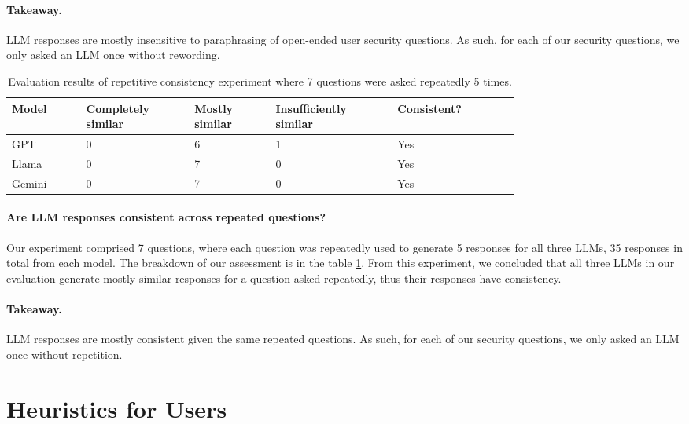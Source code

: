 \paragraph{Takeaway.} LLM responses are mostly insensitive to paraphrasing of open-ended user security questions. As such, for each of our security questions, we only asked an LLM once without rewording.

\begin{table}[!h]

\if {}
\fi
    \centering
    \setlength{\abovecaptionskip}{0pt}
    \caption{Evaluation results of repetitive consistency experiment where 7 questions were asked repeatedly 5 times.}
    \label{tab:repetitive-consistency-eval}
    \begin{tabular}{p{0.11\linewidth} p{0.16\linewidth} p{0.12\linewidth} p{0.18\linewidth} p{0.18\linewidth}}
        \toprule
        Model & Completely similar & Mostly similar & Insufficiently similar & Consistent? \\
        \midrule
        GPT & 0 & 6 & 1 & Yes\\
        Llama & 0 & 7 & 0 & Yes\\
        Gemini & 0 & 7 & 0  & Yes\\
        \bottomrule
    \end{tabular}
\end{table}

\paragraph{Are LLM responses consistent across repeated questions?} Our experiment comprised 7 questions, where each question was repeatedly used to generate 5 responses for all three LLMs, 35 responses in total from each model. The breakdown of our assessment is in the table \ref{tab:repetitive-consistency-eval}. From this experiment, we concluded that all three LLMs in our evaluation generate mostly similar responses for a question asked repeatedly, thus their responses have consistency.

\paragraph{Takeaway.} LLM responses are mostly consistent given the same repeated questions. As such, for each of our security questions, we only asked an LLM once without repetition.

\if {}
    \section{Heuristics for Users} \label{gpt-eval-results}
\fi

